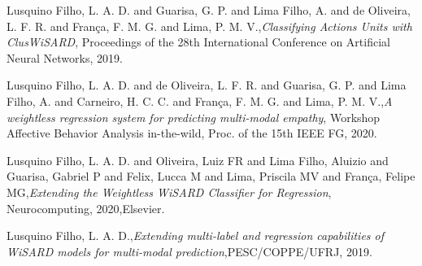 \documentclass[12pt]{article}
\begin{document}
\begin{footnotesize}
\begin{thebibliography}{99}
Lusquino Filho, L. A. D. and Guarisa, G. P. and Lima Filho, A. and de Oliveira, L. F. R. and Fran\c{c}a, F. M. G. and Lima, P. M. V.,\emph{Classifying Actions Units with ClusWiSARD}, Proceedings of the 28th International Conference on Artificial Neural Networks, 2019.

Lusquino Filho, L. A. D. and de Oliveira, L. F. R. and Guarisa, G. P. and Lima Filho, A. and Carneiro, H. C. C. and Fran\c{c}a, F. M. G. and Lima, P. M. V.,\emph{A weightless regression system for predicting multi-modal empathy}, Workshop Affective Behavior Analysis in-the-wild, Proc. of the 15th IEEE FG, 2020.

Lusquino Filho, L. A. D. and Oliveira, Luiz FR and Lima Filho, Aluizio and Guarisa, Gabriel P and Felix, Lucca M and Lima, Priscila MV and Fran{\c{c}}a, Felipe MG,\emph{Extending the Weightless WiSARD Classifier for Regression}, Neurocomputing, 2020,Elsevier.

Lusquino Filho, L. A. D.,\emph{Extending multi-label and regression capabilities of WiSARD models for multi-modal prediction},PESC/COPPE/UFRJ, 2019.

\end{thebibliography}
\end{footnotesize}
\end{document}
